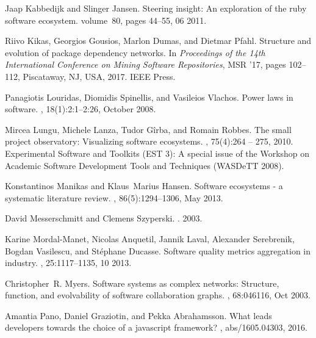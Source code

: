 \documentclass[10pt,conference]{IEEEtran}
\begin{document}
\begin{thebibliography}{10}
  Jaap Kabbedijk and Slinger Jansen.
  \newblock Steering insight: An exploration of the ruby software ecosystem.
  \newblock volume~80, pages 44--55, 06 2011.
  
  Riivo Kikas, Georgios Gousios, Marlon Dumas, and Dietmar Pfahl.
  \newblock Structure and evolution of package dependency networks.
  \newblock In {\em Proceedings of the 14th International Conference on Mining
    Software Repositories}, MSR '17, pages 102--112, Piscataway, NJ, USA, 2017.
    IEEE Press.
  
  Panagiotis Louridas, Diomidis Spinellis, and Vasileios Vlachos.
  \newblock Power laws in software.
  , 18(1):2:1--2:26, October
    2008.
  
  Mircea Lungu, Michele Lanza, Tudor Gîrba, and Romain Robbes.
  \newblock The small project observatory: Visualizing software ecosystems.
  , 75(4):264 -- 275, 2010.
  \newblock Experimental Software and Toolkits (EST 3): A special issue of the
    Workshop on Academic Software Development Tools and Techniques (WASDeTT
    2008).
  
  Konstantinos Manikas and Klaus~Marius Hansen.
  \newblock Software ecosystems - a systematic literature review.
  , 86(5):1294--1306, May 2013.
  
  David Messerschmitt and Clemens Szyperski.
  .
   2003.
  
  Karine Mordal-Manet, Nicolas Anquetil, Jannik Laval, Alexander Serebrenik,
    Bogdan Vasilescu, and Stéphane Ducasse.
  \newblock Software quality metrics aggregation in industry.
  , 25:1117--1135, 10
    2013.
  
  Christopher~R. Myers.
  \newblock Software systems as complex networks: Structure, function, and
    evolvability of software collaboration graphs.
  , 68:046116, Oct 2003.
  
  Amantia Pano, Daniel Graziotin, and Pekka Abrahamsson.
  \newblock What leads developers towards the choice of a javascript framework?
  , abs/1605.04303, 2016.
  

\end{thebibliography}
\end{document}
